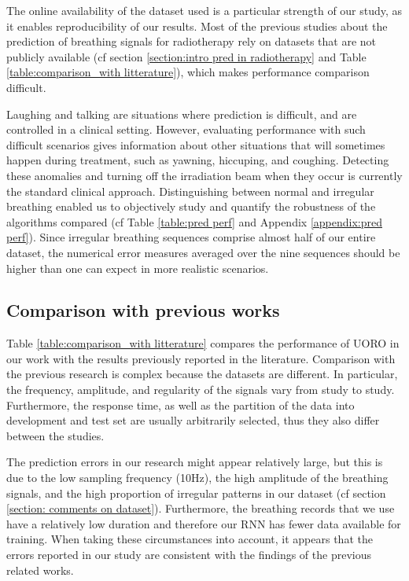 \documentclass[twocolumn,a4paper]{svjour3} \sloppy          \smartqed
\begin{document}
The online availability of the dataset used is a particular strength of our study, as it enables reproducibility of our results. Most of the previous studies about the prediction of breathing signals for radiotherapy rely on datasets that are not publicly available (cf section \ref{section:intro pred in radiotherapy} and Table \ref{table:comparison_with litterature}), which makes performance comparison difficult.

Laughing and talking are situations where prediction is difficult, and are controlled in a clinical setting. However, evaluating performance with such difficult scenarios gives information about other situations that will sometimes happen during treatment, such as yawning, hiccuping, and coughing. Detecting these anomalies and turning off the irradiation beam when they occur is currently the standard clinical approach. Distinguishing between normal and irregular breathing enabled us to objectively study and quantify the robustness of the algorithms compared (cf Table \ref{table:pred perf} and Appendix \ref{appendix:pred perf}). Since irregular breathing sequences comprise almost half of our entire dataset, the numerical error measures averaged over the nine sequences should be higher than one can expect in more realistic scenarios. 


\subsection{Comparison with previous works}


Table \ref{table:comparison_with litterature} compares the performance of UORO in our work with the results previously reported in the literature. Comparison with the previous research is complex because the datasets are different. In particular, the frequency, amplitude, and regularity of the signals vary from study to study. Furthermore, the response time, as well as the partition of the data into development and test set are usually arbitrarily selected, thus they also differ between the studies. 

The prediction errors in our research might appear relatively large, but this is due to the low sampling frequency (10Hz), the high amplitude of the breathing signals, and the high proportion of irregular patterns in our dataset (cf section \ref{section: comments on dataset}). Furthermore, the breathing records that we use have a relatively low duration and therefore our RNN has fewer data available for training. When taking these circumstances into account, it appears that the errors reported in our study are consistent with the findings of the previous related works.
\end{document}
